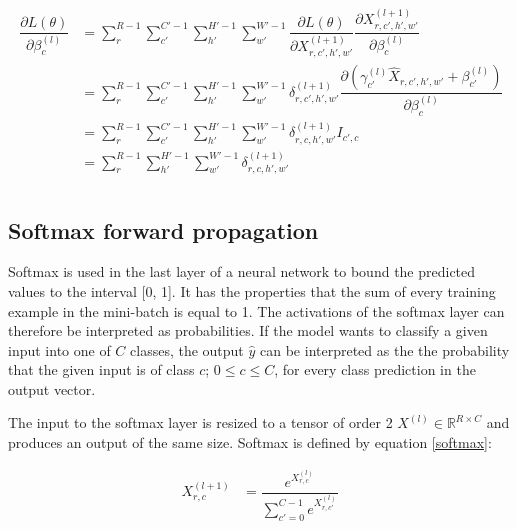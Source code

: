 \documentclass[a4paper, twoside]{article}
\newcommand*{\pd}[2]{\ensuremath{\dfrac{\partial #1}{\partial #2}}}
\begin{document}
\begin{align}
\begin{split}
	\pd{L(\theta)}{\beta^{(l)}_{c}}
		& = \sum^{R-1}_{r} \sum^{C'-1}_{c'} \sum^{H'-1}_{h'} \sum^{W'-1}_{w'} \pd{L(\theta)}{X^{(l+1)}_{r,c',h',w'}} \pd{X^{(l+1)}_{r,c',h',w'}}{\beta^{(l)}_{c}} \\
		& = \sum^{R-1}_{r} \sum^{C'-1}_{c'} \sum^{H'-1}_{h'} \sum^{W'-1}_{w'} \delta^{(l+1)}_{r,c',h',w'}  \pd{({\gamma_{c'}^{(l)} \hat{X}_{r,c',h',w'} + \beta_{c'}^{(l)}})}{\beta^{(l)}_{c}} \\
		& = \sum^{R-1}_{r} \sum^{C'-1}_{c'} \sum^{H'-1}_{h'} \sum^{W'-1}_{w'} \delta^{(l+1)}_{r,c,h',w'} I_{c',c}\\
		& = \sum^{R-1}_{r} \sum^{H'-1}_{h'} \sum^{W'-1}_{w'} \delta^{(l+1)}_{r,c,h',w'} \\
\end{split}
\end{align}

\subsection{Softmax forward propagation}
Softmax is used in the last layer of a neural network to bound the predicted values to the interval [0, 1]. It has the properties that the sum of every training example in the mini-batch is equal to 1. The activations of the softmax layer can therefore be interpreted as probabilities. If the model wants to classify a given input into one of $C$ classes, the output $\hat{y}$ can be interpreted as the the probability that the given input is of class $c$; $0 \leq c \leq C$, for every class prediction in the output vector. \cite{cs231n}

The input to the softmax layer is resized to a tensor of order 2 $X^{(l)} \in \mathbb{R}^{R \times C}$ and produces an output of the same size. Softmax is defined by equation \eqref{softmax}: \cite{cs231n}

\begin{equation}\label{softmax}
\begin{split}
X^{(l+1)}_{r,c}
	& = \dfrac{e^{X^{(l)}_{r,c}}}{\sum^{C-1}_{c'=0}e^{X^{(l)}_{r,c'}}} \\
\end{split}
\end{equation}
\end{document}
